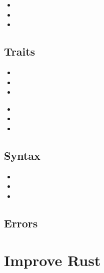 \documentclass[50pt]{beamer}
\begin{document}
    \begin{frame}
        \begin{itemize}
            \item
            \item
            \item
        \end{itemize}
    \end{frame}

\subsection{Traits}
    \begin{frame}
        \begin{itemize}
            \item
            \item
            \item
        \end{itemize}
    \end{frame}


    \begin{frame}
        \begin{itemize}
            \item
            \item
            \item
        \end{itemize}
    \end{frame}

\subsection{Syntax}

    \begin{frame}
        \begin{itemize}
            \item
            \item
            \item
        \end{itemize}
    \end{frame}

\subsection{Errors}

\section{Improve Rust}
\end{document}
